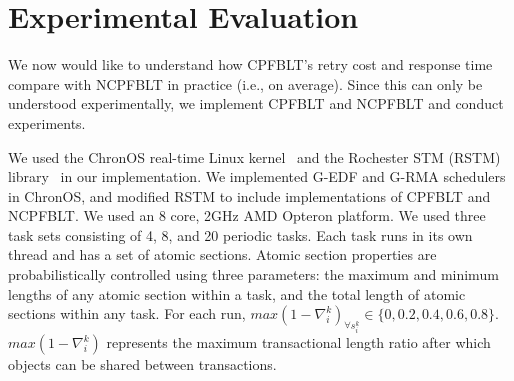 \documentclass[preprint]{sigplanconf}
\begin{document}
\section{Experimental Evaluation}\label{exp_eval}
%
We now would like to understand how CPFBLT's retry cost and response time compare with NCPFBLT in practice (i.e., on average). Since this can only be understood experimentally, we implement CPFBLT and NCPFBLT and conduct experiments. 

We used the ChronOS real-time Linux kernel~\cite{dellinger2011chronos} and the Rochester STM (RSTM) library~\cite{marathe2006lowering} in our implementation. We implemented G-EDF and G-RMA schedulers in ChronOS, and modified RSTM to include implementations of CPFBLT and NCPFBLT. We used an 8 core, 2GHz AMD Opteron platform. We used three task sets consisting of 4, 8, and 20 periodic tasks. Each task runs in its own thread and has a set of atomic sections. Atomic section properties are probabilistically controlled using three parameters: the maximum and minimum lengths of any atomic section within a task, and the total length of atomic sections within any task. For each run, $max(1-\nabla_i^k)_{\forall s_i^k} \in \{0,0.2,0.4,0.6,0.8\}$. $max(1-\nabla_i^k)$ represents the maximum transactional length ratio after which objects can be shared between transactions.
\end{document}
